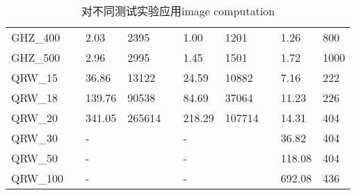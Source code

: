 \documentclass{article}
\begin{document}
\begin{itemize}
\begin{table}[!htbp]
{\begin{tabular}{llllllllll}
                GHZ\_400    &  & 2.03    & 2395    &  & 1.00      & 1201    &  & 1.26           & 800 \\%
                GHZ\_500    &  & 2.96    & 2995    &  & 1.45      & 1501    &  & 1.72           & 1000\\%
                \hline
                QRW\_15     &  & 36.86   & 13122     &  & 24.59     & 10882     & & 7.16  & 222 \\
                QRW\_18     &  & 139.76  & 90538     &  & 84.69     & 37064     & & 11.23 & 226 \\
                QRW\_20     &  & 341.05  & 265614    &  & 218.29    & 107714    & & 14.31 & 404 \\
                QRW\_30     &   &-       &          &  &-          &          & & 36.82 & 404 \\
                QRW\_50     &   &-       &          &  &-          &          & & 118.08 & 404 \\
                QRW\_100    &   &-       &          &  &-          &          & & 692.08 & 436 \\
                \hline
            \end{tabular}
        }
        \caption{对不同测试实验应用image computation}
        \label{table:time}
    \end{table}
\end{itemize}
\end{document}
